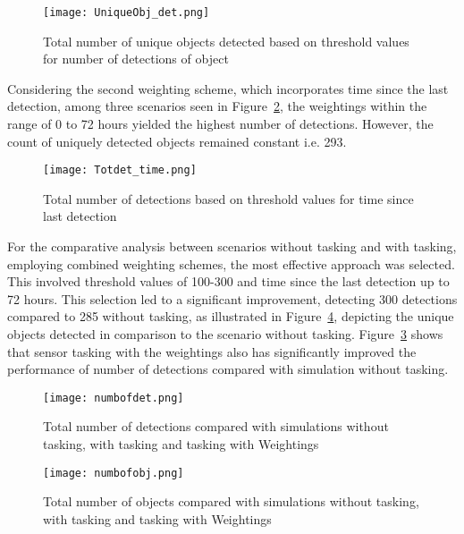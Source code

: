 \begin{figure}[h!]
	\centering
	\texttt{[image: UniqueObj\_det.png]}
	\caption{Total number of unique objects detected based on threshold values for number of detections of object}\label{fig:UniqueObj_det}
\end{figure}

Considering the second weighting scheme, which incorporates time since the last detection, among three scenarios seen in Figure~\ref{fig:Totdet_time}, the weightings within the range of 0 to 72 hours yielded the highest number of detections. However, the count of uniquely detected objects remained constant i.e. 293.\\

\begin{figure}[h!]
	\centering
	\texttt{[image: Totdet\_time.png]}
	\caption{Total number of detections based on threshold values for time since last detection}\label{fig:Totdet_time}
\end{figure}

For the comparative analysis between scenarios without tasking and with tasking, employing combined weighting schemes, the most effective approach was selected. This involved threshold values of 100-300 and time since the last detection up to 72 hours. This selection led to a significant improvement, detecting 300 detections compared to 285 without tasking, as illustrated in Figure~\ref{fig:numbofobj}, depicting the unique objects detected in comparison to the scenario without tasking. Figure~\ref{fig:numbofdet} shows that sensor tasking with the weightings also has significantly improved the performance of number of detections compared with simulation without tasking.\\

\begin{figure}[H]
	\centering
	\texttt{[image: numbofdet.png]}
	\caption{Total number of detections compared with simulations without tasking, with tasking and tasking with Weightings}\label{fig:}\label{fig:numbofdet}
\end{figure}

\begin{figure}[h!]
	\centering
	\texttt{[image: numbofobj.png]}
	\caption{Total number of objects compared with simulations without tasking, with tasking and tasking with Weightings}\label{fig:}\label{fig:numbofobj}
\end{figure}


